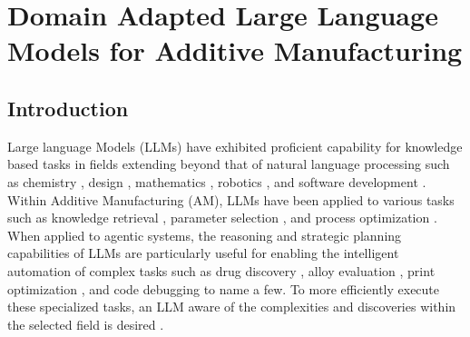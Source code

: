 \chapter{Domain Adapted Large Language Models for Additive Manufacturing}
\label{chapter:dapt_am}

\section{Introduction}
Large language Models (LLMs) have exhibited proficient capability for knowledge
based tasks in fields extending beyond that of natural language processing such
as chemistry \cite{zeng_llm-guided_2025, ock_adsorb-agent_2026,
balaji_gpt-molberta_2023}, design \cite{jadhav_large_2026, wang_human-llm_2025,
zhou_exploring_2024, xu_llm_2024}, mathematics \cite{pei_mathfusion_2025,
shojaee_llm-sr_2024, kumarappan_leanagent_2025, lorsung_explain_2024}, robotics
\cite{george_llm_2025, arnab_vivit_2021, barkley_semantic_2025,
barkley_synthesizing_2026, bartsch_llm-craft_2025}, and software development
\cite{he_llm-based_2025, xia_agentless_2024, han_tdflow_2026}. Within Additive
Manufacturing (AM), LLMs have been applied to various tasks such as knowledge
retrieval \cite{chandrasekhar_amgpt_2024, naghavi_khanghah_multimodal_2025},
parameter selection \cite{pak_additivellm_2025, pak_agentic_2026}, and process
optimization \cite{jadhav_llm-3d_2025}. When applied to agentic systems, the
reasoning and strategic planning capabilities of LLMs are particularly useful
for enabling the intelligent automation of complex tasks such as drug discovery
\cite{ock_large_2025}, alloy evaluation \cite{pak_agentic_2026}, print
optimization \cite{jadhav_llm-3d_2025}, and code debugging
\cite{han_tdflow_2026} to name a few. To more efficiently execute these
specialized tasks, an LLM aware of the complexities and discoveries within the
selected field is desired \cite{gururangan_dont_2020, bajan_exploring_2025,
lu_fine-tuning_2025}.

